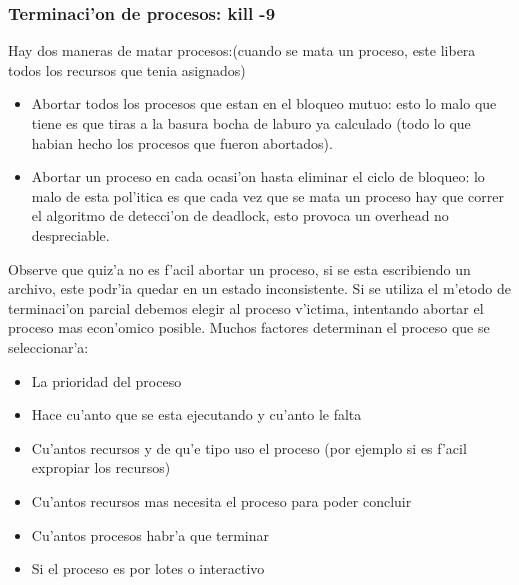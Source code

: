 \subsubsection{Terminaci'on de procesos: kill -9}
Hay dos maneras de matar procesos:(cuando se mata un proceso, este libera todos los recursos que tenia asignados)
\begin{itemize}
 \item Abortar todos los procesos que estan en el bloqueo mutuo: esto lo malo que tiene es que tiras a la basura bocha de laburo ya calculado (todo lo que habian hecho los procesos que fueron abortados).
 \item Abortar un proceso en cada ocasi'on hasta eliminar el ciclo de bloqueo: lo malo de esta pol'itica es que cada vez que se mata un proceso hay que correr el algoritmo de detecci'on de deadlock, esto provoca un overhead no despreciable.
\end{itemize}
Observe que quiz'a no es f'acil abortar un proceso, si se esta escribiendo un archivo, este podr'ia quedar en un estado inconsistente.
Si se utiliza el m'etodo de terminaci'on parcial debemos elegir al proceso v'ictima, intentando abortar el proceso mas econ'omico posible. Muchos factores determinan el proceso que se seleccionar'a:
\begin{itemize}
 \item La prioridad del proceso
 \item Hace cu'anto que se esta ejecutando y cu'anto le falta
 \item Cu'antos recursos y de qu'e tipo uso el proceso (por ejemplo si es f'acil expropiar los recursos)
 \item Cu'antos recursos mas necesita el proceso para poder concluir
 \item Cu'antos procesos habr'a que terminar
 \item Si el proceso es por lotes o interactivo
\end{itemize}


